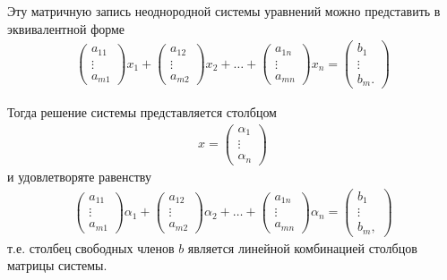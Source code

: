\documentclass[%
	11pt,
	a4paper,
	utf8,
		]{article}
\begin{document}
Эту матричную запись неоднородной системы уравнений можно представить в эквивалентной форме
\begin{align*}
	\begin{pmatrix}
		a_{11} \\
		\vdots \\
		a_{m1}
	\end{pmatrix} x_1 + 
    \begin{pmatrix}
    	a_{12} \\
    	\vdots \\
    	a_{m2}
    \end{pmatrix} x_2 + \ldots +
    \begin{pmatrix}
    	a_{1n} \\
    	\vdots \\
    	a_{mn}
    \end{pmatrix} x_n = 
    \begin{pmatrix}
    	b_1 \\
    	\vdots \\
    	b_m.
    \end{pmatrix}
\end{align*}

Тогда решение системы представляется столбцом
\begin{align*}
	x =
	\begin{pmatrix}
		\alpha_1 \\
		\vdots \\
		\alpha_n
	\end{pmatrix}
\end{align*}
и удовлетворяте равенству
\begin{align*}
	\begin{pmatrix}
		a_{11} \\
		\vdots \\
		a_{m1}
	\end{pmatrix} \alpha_1 +
    \begin{pmatrix}
    	a_{12} \\
    	\vdots \\
    	a_{m2}
    \end{pmatrix} \alpha_2 + \ldots + 
    \begin{pmatrix}
    	a_{1n} \\
    	\vdots \\
    	a_{mn}
    \end{pmatrix} \alpha_n =
    \begin{pmatrix}
    	b_1 \\
    	\vdots \\
    	b_m,
    \end{pmatrix}
\end{align*}
т.е. столбец свободных членов $ b $ является линейной комбинацией столбцов матрицы системы.
\end{document}
